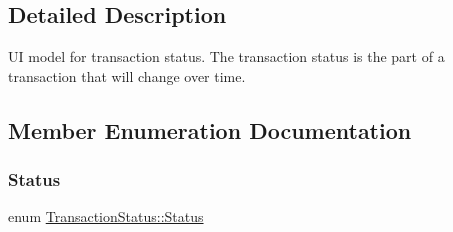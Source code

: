 \subsection{Detailed Description}
UI model for transaction status. The transaction status is the part of a transaction that will change over time. 

\subsection{Member Enumeration Documentation}
\mbox{\label{class_transaction_status_aaa6cc19ca3509bbae72d0df1661f85cb}} 
\subsubsection{\texorpdfstring{Status}{Status}}
{\footnotesize\ttfamily enum \mbox{\hyperlink{class_transaction_status_aaa6cc19ca3509bbae72d0df1661f85cb}{Transaction\+Status\+::\+Status}}}


